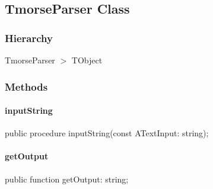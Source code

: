 \documentclass{report}
\newif\ifpdf
\begin{document}
\subsection*{TmorseParser Class}
\fi
\label{morse.parser.Util.TmorseParser}
\subsubsection*{\large{\textbf{Hierarchy}}\normalsize\hspace{1ex}\hfill}
TmorseParser {$>$} TObject
\subsubsection*{\large{\textbf{Methods}}\normalsize\hspace{1ex}\hfill}
\paragraph*{inputString}\hspace*{\fill}

\label{morse.parser.Util.TmorseParser-inputString}
\begin{list}{}{
\setlength{\itemindent}{0cm}
\setlength{\listparindent}{0cm}
\setlength{\leftmargin}{\evensidemargin}
\addtolength{\leftmargin}{\tmplength}
\settowidth{\labelsep}{X}
\addtolength{\leftmargin}{\labelsep}
\setlength{\labelwidth}{\tmplength}
}
\item[\textbf{Declaration}\hfill]
\ifpdf
\begin{flushleft}
\fi
\begin{ttfamily}
public procedure inputString(const ATextInput: string);\end{ttfamily}

\ifpdf
\end{flushleft}
\fi

\end{list}
\paragraph*{getOutput}\hspace*{\fill}

\label{morse.parser.Util.TmorseParser-getOutput}
\begin{list}{}{
\setlength{\itemindent}{0cm}
\setlength{\listparindent}{0cm}
\setlength{\leftmargin}{\evensidemargin}
\addtolength{\leftmargin}{\tmplength}
\settowidth{\labelsep}{X}
\addtolength{\leftmargin}{\labelsep}
\setlength{\labelwidth}{\tmplength}
}
\item[\textbf{Declaration}\hfill]
\ifpdf
\begin{flushleft}
\fi
\begin{ttfamily}
public function getOutput: string;\end{ttfamily}

\ifpdf
\end{flushleft}
\fi

\end{list}
\end{document}
